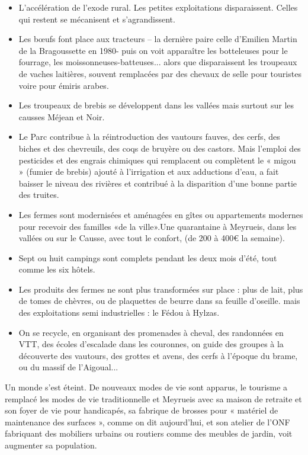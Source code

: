 \begin{itemize}
    \item L’accélération de l’exode rural. Les petites exploitations disparaissent. Celles qui
    restent se mécanisent et s’agrandissent.

    \item Les bœufs font place aux tracteurs -- la dernière paire celle d’Emilien Martin de la
    Bragoussette en 1980- puis on voit apparaître les botteleuses pour le fourrage, les
    moissonneuses-batteuses... alors que disparaissent les troupeaux de vaches laitières,
    souvent remplacées par des chevaux de selle pour touristes voire pour émiris arabes.

    \item Les troupeaux de brebis se développent dans les vallées mais surtout sur les causses
    Méjean et Noir.

    \item Le Parc contribue à la réintroduction des vautours fauves, des cerfs, des biches et des
    chevreuils, des coqs de bruyère ou des castors. Mais l’emploi des pesticides et des
    engrais chimiques qui remplacent ou complètent le « migou » (fumier de brebis)
    ajouté à l’irrigation et aux adductions d’eau, a fait baisser le niveau des rivières et
    contribué à la disparition d’une bonne partie des truites.

    \item Les fermes sont modernisées et aménagées en gîtes ou appartements modernes pour
    recevoir des familles «de la ville».Une quarantaine à Meyrueis, dans les vallées ou sur
    le Causse, avec tout le confort, (de 200 à 400€ la semaine).

    \item Sept ou huit campings sont complets pendant les deux mois d’été, tout comme les six
    hôtels.

    \item Les produits des fermes ne sont plus transformées sur place : plus de lait, plus de
    tomes de chèvres, ou de plaquettes de beurre dans sa feuille d’oseille. mais des
    exploitations semi industrielles : le Fédou à Hylzas.

    \item On se recycle, en organisant des promenades à cheval, des randonnées en VTT, des
    écoles d’escalade dans les couronnes, on guide des groupes à la découverte des
    vautours, des grottes et avens, des cerfs à l’époque du brame, ou du massif de
    l’Aigoual...
\end{itemize}

Un monde s’est éteint. De nouveaux modes de vie sont apparus, le tourisme a remplacé les
modes de vie traditionnelle et Meyrueis avec sa maison de retraite et son foyer de vie pour
handicapés, sa fabrique de brosses pour « matériel de maintenance des surfaces », comme on
dit aujourd’hui, et son atelier de l’ONF fabriquant des mobiliers urbains ou routiers comme
des meubles de jardin, voit augmenter sa population.
